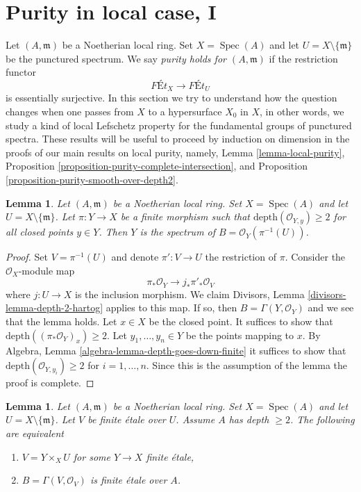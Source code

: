 \documentclass{stacks-project}
\theoremstyle{plain}
\newtheorem{lemma}[subsection]{Lemma}
\theoremstyle{definition}
\theoremstyle{remark}
\numberwithin{equation}{subsection}
\def\Spec{\mathop{\mathrm{Spec}}}
\begin{document}
\section{Purity in local case, I}
\label{section-local-purity}

\noindent
Let $(A, \mathfrak m)$ be a Noetherian local ring. Set $X = \Spec(A)$
and let $U = X \setminus \{\mathfrak m\}$ be the punctured spectrum.
We say {\it purity holds for $(A, \mathfrak m)$} if the restriction functor
$$
\textit{F\'Et}_X \longrightarrow \textit{F\'Et}_U
$$
is essentially surjective. In this section we try to understand how the
question changes when one passes from $X$ to a hypersurface $X_0$ in $X$,
in other words, we study a kind of local Lefschetz property for the
fundamental groups of punctured spectra.
These results will be useful to proceed by induction on dimension
in the proofs of our main results on local purity, namely,
Lemma \ref{lemma-local-purity},
Proposition \ref{proposition-purity-complete-intersection}, and
Proposition \ref{proposition-purity-smooth-over-depth2}.

\begin{lemma}
\label{lemma-sections-over-punctured-spec}
Let $(A, \mathfrak m)$ be a Noetherian local ring. Set $X = \Spec(A)$
and let $U = X \setminus \{\mathfrak m\}$.
Let $\pi : Y \to X$ be a finite morphism such that
$\text{depth}(\mathcal{O}_{Y, y}) \geq 2$ for all closed points
$y \in Y$.
Then $Y$ is the spectrum of $B = \mathcal{O}_Y(\pi^{-1}(U))$.
\end{lemma}

\begin{proof}
Set $V = \pi^{-1}(U)$ and denote $\pi' : V \to U$ the restriction of $\pi$.
Consider the $\mathcal{O}_X$-module map
$$
\pi_*\mathcal{O}_Y \longrightarrow j_*\pi'_*\mathcal{O}_V
$$
where $j : U \to X$ is the inclusion morphism. We claim
Divisors, Lemma \ref{divisors-lemma-depth-2-hartog}
applies to this map. If so, then $B = \Gamma(Y, \mathcal{O}_Y)$
and we see that the lemma holds. Let $x \in X$ be the closed point.
It suffices to show that
$\text{depth}((\pi_*\mathcal{O}_Y)_x) \geq 2$.
Let $y_1, \ldots, y_n \in Y$ be the points mapping to $x$.
By Algebra, Lemma \ref{algebra-lemma-depth-goes-down-finite}
it suffices to show that
$\text{depth}(\mathcal{O}_{Y, y_i}) \geq 2$ for $i = 1, \ldots, n$.
Since this is the assumption of the lemma the proof is complete.
\end{proof}

\begin{lemma}
\label{lemma-reformulate-purity}
Let $(A, \mathfrak m)$ be a Noetherian local ring. Set $X = \Spec(A)$
and let $U = X \setminus \{\mathfrak m\}$.
Let $V$ be finite \'etale
over $U$. Assume $A$ has depth $\geq 2$. The following are equivalent
\begin{enumerate}
\item $V = Y \times_X U$ for some $Y \to X$ finite \'etale,
\item $B = \Gamma(V, \mathcal{O}_V)$ is finite \'etale over $A$.
\end{enumerate}
\end{lemma}
\end{document}
